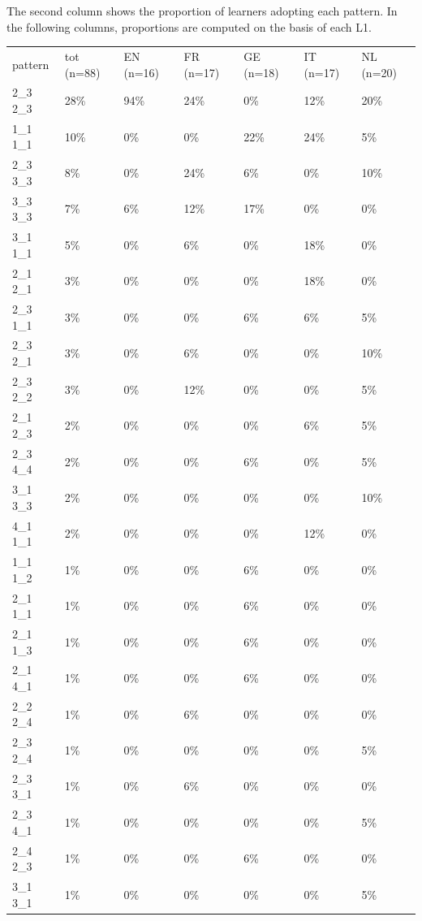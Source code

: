 The second column shows the proportion of learners adopting each pattern. In the following columns, proportions are computed on the basis of each L1.

\begin{table}
    \begin{tabularx}{\textwidth}{XXXXXXX}
    \lsptoprule
    
    pattern & tot (n=88) & EN (n=16) & FR (n=17) & GE (n=18) & IT (n=17) & NL (n=20)\\
    2\_3 2\_3 & 28\% & 94\% & 24\% & 0\% & 12\% & 20\%\\
    1\_1 1\_1 & 10\% & 0\% & 0\% & 22\% & 24\% & 5\%\\
    2\_3 3\_3 & 8\% & 0\% & 24\% & 6\% & 0\% & 10\%\\
    3\_3 3\_3 & 7\% & 6\% & 12\% & 17\% & 0\% & 0\%\\
    3\_1 1\_1 & 5\% & 0\% & 6\% & 0\% & 18\% & 0\%\\
    2\_1 2\_1 & 3\% & 0\% & 0\% & 0\% & 18\% & 0\%\\
    2\_3 1\_1 & 3\% & 0\% & 0\% & 6\% & 6\% & 5\%\\
    2\_3 2\_1 & 3\% & 0\% & 6\% & 0\% & 0\% & 10\%\\
    2\_3 2\_2 & 3\% & 0\% & 12\% & 0\% & 0\% & 5\%\\
    2\_1 2\_3 & 2\% & 0\% & 0\% & 0\% & 6\% & 5\%\\
    2\_3 4\_4 & 2\% & 0\% & 0\% & 6\% & 0\% & 5\%\\
    3\_1 3\_3 & 2\% & 0\% & 0\% & 0\% & 0\% & 10\%\\
    4\_1 1\_1 & 2\% & 0\% & 0\% & 0\% & 12\% & 0\%\\
    1\_1 1\_2 & 1\% & 0\% & 0\% & 6\% & 0\% & 0\%\\
    2\_1 1\_1 & 1\% & 0\% & 0\% & 6\% & 0\% & 0\%\\
    2\_1 1\_3 & 1\% & 0\% & 0\% & 6\% & 0\% & 0\%\\
    2\_1 4\_1 & 1\% & 0\% & 0\% & 6\% & 0\% & 0\%\\
    2\_2 2\_4 & 1\% & 0\% & 6\% & 0\% & 0\% & 0\%\\
    2\_3 2\_4 & 1\% & 0\% & 0\% & 0\% & 0\% & 5\%\\
    2\_3 3\_1 & 1\% & 0\% & 6\% & 0\% & 0\% & 0\%\\
    2\_3 4\_1 & 1\% & 0\% & 0\% & 0\% & 0\% & 5\%\\
    2\_4 2\_3 & 1\% & 0\% & 0\% & 6\% & 0\% & 0\%\\
    3\_1 3\_1 & 1\% & 0\% & 0\% & 0\% & 0\% & 5\%\\

\end{tabularx}
\end{table}
